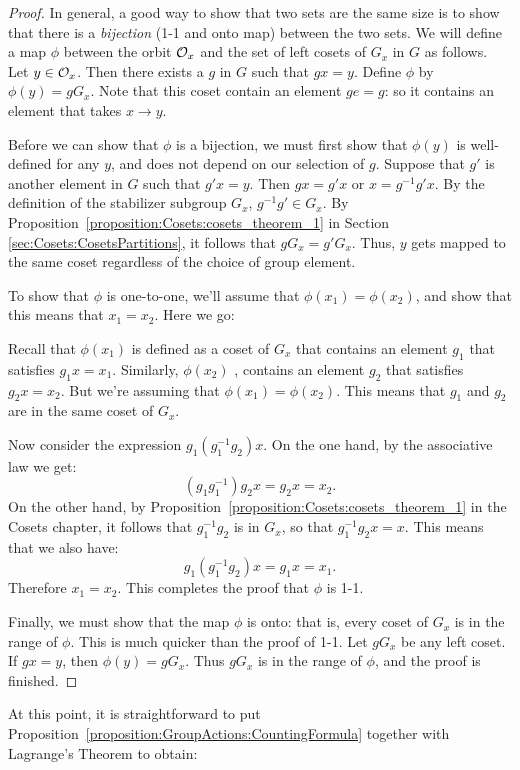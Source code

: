 \begin{proof}
In general, a good way to show that two sets are the same size is to show that there is a \emph{bijection} (1-1 and onto map) between the two sets.  
 We will define a map $\phi$
between the orbit ${\cal O}_x$ and the set of left cosets of $G_x$ in $G$ as follows. Let $y \in {\cal O}_x$. Then there 
exists a $g$ in $G$ such that $g x = y$. Define $\phi$ by $\phi( y ) 
= g G_x$. Note that this coset contain an element $ge=g$:  so it contains an element that takes $x\rightarrow y$.  

Before we can show that $\phi$ is a bijection, we must first show that $\phi(y)$ is well-defined for any $y$, and does 
not depend on our selection of $g$. Suppose that $g'$ is another 
element in $G$ such that $g'x = y$. Then $g x = g' x$ or $x= g^{-1} g' x$. 
By the definition of the stabilizer subgroup $G_x$, $g^{-1}g'\in G_x$. By Proposition~\ref{proposition:Cosets:cosets_theorem_1} in Section \ref{sec:Cosets:CosetsPartitions}, it follows that 
 $g G_x = g' G_x$. Thus, $y$ gets mapped to the same 
coset regardless of the choice of group element.


To show that $\phi$ is one-to-one, we'll assume that $\phi(x_1) =
\phi(x_2)$, and show that this means that $x_1=x_2$. Here we go: 

Recall that $\phi(x_1)$ is defined as a coset of $G_x$ that contains an element $g_1$ that satisfies $g_1x=x_1.$   Similarly,  $\phi(x_2)$ , contains  an element $g_2$ that satisfies $g_2x=x_2$. But we're assuming that $\phi(x_1) =
\phi(x_2)$.  This means that $g_1$ and $g_2$ are in the same coset of $G_x$.  

Now consider the expression $g_1(g_1^{-1}g_2)x$. On the one hand, by the associative law we get:
$$(g_1g_1^{-1})g_2x=g_2x=x_2.$$ 
 On the other hand, by Proposition~\ref{proposition:Cosets:cosets_theorem_1} in the Cosets chapter, it follows that $g_1^{-1}g_2$ is in $G_x$, so that $g_1^{-1}g_2x=x$.  This means that we also have:
$$g_1(g_1^{-1}g_2)x=g_1x=x_1.$$
  Therefore $x_1=x_2$.  This completes the proof that $\phi$ is 1-1.

Finally, we must show
that the map $\phi$ is onto: that is, every coset of $G_x$ is in the range of $\phi$. This is much quicker than the proof of 1-1. 
Let $g G_x$ be any  left coset. If $g x =y$, then $\phi(y) = g G_x$.  Thus $gG_x$ is in the range of $\phi$, and the proof is finished.
\end{proof}

At this point, it is straightforward to  put Proposition~\ref{proposition:GroupActions:CountingFormula} together with Lagrange's Theorem to obtain:


